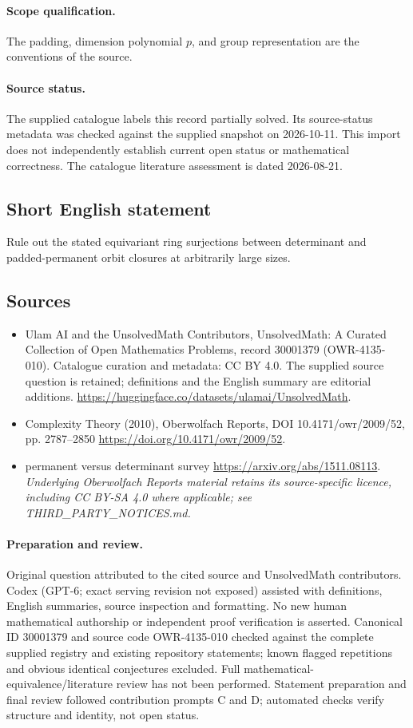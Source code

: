 \documentclass[11pt]{article}
\begin{document}
\paragraph{Scope qualification.}
The padding, dimension polynomial $p$, and group representation are the conventions of the source.
\paragraph{Source status.}
The supplied catalogue labels this record partially solved. Its source-status metadata was checked against the supplied snapshot on 2026-10-11. This import does not independently establish current open status or mathematical correctness. The catalogue literature assessment is dated 2026-08-21.
\subsection{Short English statement}
Rule out the stated equivariant ring surjections between determinant and padded-permanent orbit closures at arbitrarily large sizes.
\subsection{Sources}
\begin{itemize}
\item[S1] Ulam AI and the UnsolvedMath Contributors, UnsolvedMath: A Curated Collection of Open Mathematics Problems, record 30001379 (OWR-4135-010). Catalogue curation and metadata: CC BY 4.0. The supplied source question is retained; definitions and the English summary are editorial additions.
\url{https://huggingface.co/datasets/ulamai/UnsolvedMath}.
\item[S2] Complexity Theory (2010), Oberwolfach Reports, DOI 10.4171/owr/2009/52, pp. 2787--2850
\url{https://doi.org/10.4171/owr/2009/52}.
\item[S3] permanent versus determinant survey
\url{https://arxiv.org/abs/1511.08113}.
\textit{Underlying Oberwolfach Reports material retains its source-specific licence, including CC BY-SA 4.0 where applicable; see THIRD\_PARTY\_NOTICES.md.}
\end{itemize}
\paragraph{Preparation and review.}
Original question attributed to the cited source and UnsolvedMath contributors. Codex (GPT-6; exact serving revision not exposed) assisted with definitions, English summaries, source inspection and formatting. No new human mathematical authorship or independent proof verification is asserted. Canonical ID 30001379 and source code OWR-4135-010 checked against the complete supplied registry and existing repository statements; known flagged repetitions and obvious identical conjectures excluded. Full mathematical-equivalence/literature review has not been performed. Statement preparation and final review followed contribution prompts C and D; automated checks verify structure and identity, not open status.
\label{end:30001379}
\end{document}

